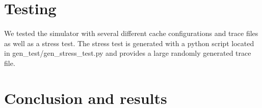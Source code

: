 \documentclass[11pt]{article}
\begin{document}
\section{Testing}
\paragraph{}
We tested the simulator with several different cache configurations and trace files as well as a stress test. The stress test is generated with a python script located in gen\_test/gen\_stress\_test.py and provides a large randomly generated trace file. 

\section{Conclusion and results}
\paragraph{}
\end{document}
